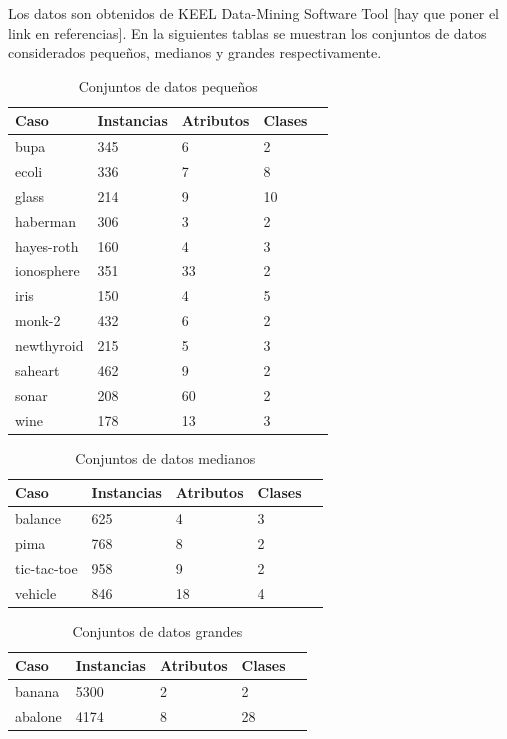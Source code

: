 \documentclass[11pt]{article}
\begin{document}
Los datos son obtenidos de KEEL 
Data-Mining Software Tool [hay que poner el link en referencias].
En la siguientes tablas se muestran los conjuntos de datos considerados pequeños, medianos y grandes respectivamente.

\begin{table}[h]
\begin{tabular}{ |l|l|l|l|l| }
    \hline
    Caso    & Instancias & Atributos & Clases \\ \hline
    bupa & 345  & 6 &  2 \\ \hline
    ecoli & 336 & 7 & 8 \\ \hline
    glass & 214 & 9 & 10 \\ \hline
    haberman & 306 & 3 & 2 \\ \hline
    hayes-roth & 160 & 4 & 3 \\ \hline
    ionosphere & 351 & 33 & 2 \\ \hline
    iris & 150 & 4 & 5 \\ \hline
    monk-2 & 432 & 6 & 2 \\ \hline
    newthyroid & 215  & 5 & 3 \\ \hline
    saheart & 462 & 9 & 2 \\ \hline
    sonar & 208 & 60 & 2 \\ \hline
    wine & 178 & 13 & 3 \\ \hline
\end{tabular}
\caption{Conjuntos de datos pequeños}
\label{tabla:1}
\end{table}

\begin{table}[h]
\begin{tabular}{ |l|l|l|l|l| }
    \hline
    Caso    & Instancias & Atributos & Clases \\ \hline
    balance & 625  & 4 &  3 \\ \hline
    pima & 768  & 8 &  2 \\ \hline
    tic-tac-toe & 958  & 9 &  2 \\ \hline
    vehicle & 846  & 18 &  4 \\ \hline
\end{tabular}
\caption{Conjuntos de datos medianos}
\label{tabla:1}
\end{table}

\begin{table}[h]
\begin{tabular}{ |l|l|l|l|l| }
    \hline
    Caso    & Instancias & Atributos & Clases \\ \hline
    banana & 5300  & 2 &  2 \\ \hline
    abalone & 4174  & 8 &  28 \\ \hline
\end{tabular}
\caption{Conjuntos de datos grandes}
\label{tabla:1}
\end{table}
\end{document}
